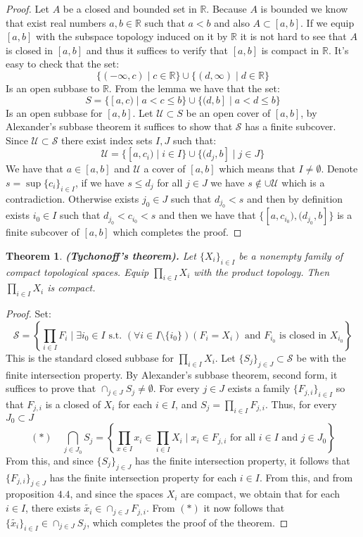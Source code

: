 \documentclass[11pt,a4paper]{article}
\theoremstyle{definition}
\theoremstyle{plain}
\newtheorem{theorem}{Theorem}[section]
\newcommand{\st}{\text{ s.t. }}
\newcommand{\R}{\mathbb{R}}
\newcommand{\set}[2]{ \left\{ #1 \mid #2 \right\} }
\renewcommand{\tt}[1]{\textnormal{\textbf{(#1).}}} %
\begin{document}
	\begin{proof}
		Let $A$ be a closed and bounded set in $\R$. Because $A$ is bounded
		we know that exist real numbers $a,b \in \R$ such that $a < b$ and
		also $A \subset [a,b]$. If we equip $[a,b]$ with the subspace
		topology induced on it by $\R$ it is not hard to see that $A$ is
		closed in $[a,b]$ and thus it suffices to verify that $[a,b]$
		is compact in $\R$. It's easy to check that the set:
		\[
			\{(-\infty, c) \mid c \in \R\} \cup 
			\{(d, \infty) \mid d \in \R\}
		\]
		Is an open subbase to $\R$. From the lemma we have that the set:
		\[
			S = \{[a, c) \mid a < c \le b\} \cup 
			\{(d, b] \mid a < d \le b\}
		\]
		Is an open subbase for $[a,b]$. Let $\mathcal{U} \subset S$ be an
		open cover of $[a,b]$, by Alexander's subbase theorem it suffices
		to show that $\mathcal{S}$ has a finite subcover. Since 
		$\mathcal{U} \subset \mathcal{S}$ there exist index sets $I,J$ such 
		that:
		\[
			\mathcal{U} = 
			\{[a,c_i) \mid i \in I\} \cup \{(d_j,b] \mid j \in J\}
		\]
		We have that $a \in [a,b]$ and $\mathcal{U}$ a cover of $[a,b]$
		which means that $I \neq \emptyset$. 
		Denote $s = \sup\{c_i\}_{i\in I}$,  if we have $s \le d_j$ for
		all $j \in J$ we have $s \notin \cup\mathcal{U}$ which is a 
		contradiction. Otherwise exists $j_0 \in J$ such that 
		$d_{j_0} < s$ and then by definition exists $i_0 \in I$ such that
		$d_{j_0} < c_{i_0} < s$ and then we have that 
		$\{[a,c_{i_0}), (d_{j_0},b]\}$ is a finite subcover of $[a,b]$ which
		completes the proof.
	\end{proof}
	\begin{theorem}
		\tt{Tychonoff’s theorem}
		Let $\{X_i\}_{i \in I}$ be a nonempty family of compact topological 
		spaces. Equip $\prod_{i \in I}{X_i}$ with the product topology. Then 
		$\prod_{i \in I}{X_i}$ is compact.
	\end{theorem}
	\begin{proof}
		Set:
		\[
			\mathcal{S} = 
			\left\{\prod_{i \in I}{F_i} \mid \exists i_0 \in I \st
			(\forall i \in I \setminus \{i_0\})(F_i = X_i) \text{ and }
			F_{i_0} \text{ is closed in } X_{i_0}
			\right\}
		\]
		This is the standard closed subbase for $\prod_{i \in I}{X_i}$.
		Let $\{S_j\}_{j \in J} \subset \mathcal{S}$ be with the finite
		intersection property. By Alexander's subbase theorem, second form, 
		it suffices to prove that $\cap_{j \in J}{S_j} \neq \emptyset$.
		For every $j \in J$ exists a family $\{F_{j,i}\}_{i \in I}$ so that
		$F_{j,i}$ is a closed of $X_i$ for each $i \in I$, and 
		$S_j = \prod_{i \in I}{F_{j,i}}$. Thus, for every $J_0 \subset J$
		\[
			(*) \quad \bigcap_{j \in J_0}{{S}_j} = 
			\set{\prod_{x \in I}{x_i} \in \prod_{i \in I}{X_i}}
			{x_i \in F_{j,i} \text{ for all $i \in I$ and $j \in J_0$}}
		\]
		From this, and since $\{S_j\}_{j \in J}$ has the finite intersection
		property, it follows that $\{F_{j,i}\}_{j \in J}$ has the finite
		intersection property for each $i \in I$. From this, and from 
		proposition $4.4$, and since the spaces $X_i$ are compact, we obtain
		that for each $i \in I$, there exists 
		$\tilde{x_i} \in \cap_{j \in J}{F_{j,i}}$. From $(*)$ it now follows
		that $\{\tilde{x_i}\}_{i \in I} \in \cap_{j \in J}{{S}_j}$, which
		completes the proof of the theorem.
	\end{proof}
\end{document}
